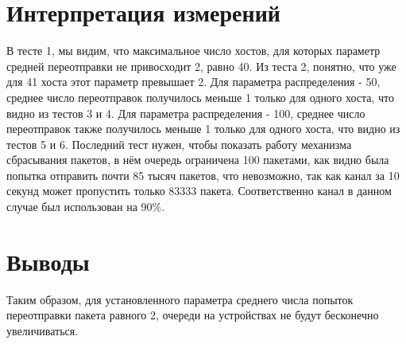 \documentclass[a4peper, 12pt, titlepage, finall]{extreport}
\begin{document}
    \section{Интерпретация измерений}
        В тесте 1, мы видим, что максимальное число хостов, для которых параметр средней переотправки не привосходит 2, равно 40.
        Из теста 2, понятно, что уже для 41 хоста этот параметр превышает 2.
        Для параметра распределения - 50, среднее число переотправок получилось меньше 1 только для одного хоста, что видно из тестов 3 и 4.
        Для параметра распределения - 100, среднее число переотправок также получилось меньше 1 только для одного хоста, что видно из тестов 5 и 6.
        Последний тест нужен, чтобы показать работу механизма сбрасывания пакетов, в нём очередь ограничена 100 пакетами, 
        как видно была попытка отправить почти 85 тысяч пакетов, что невозможно, так как канал за 10 секунд может пропустить только 83333 пакета.
        Соответственно канал в данном случае был использован на 90\%.
    \section{Выводы}
        Таким образом, для установленного параметра среднего числа попыток переотправки пакета равного 2, 
        очереди на устройствах не будут бесконечно увеличиваться.
\end{document}
